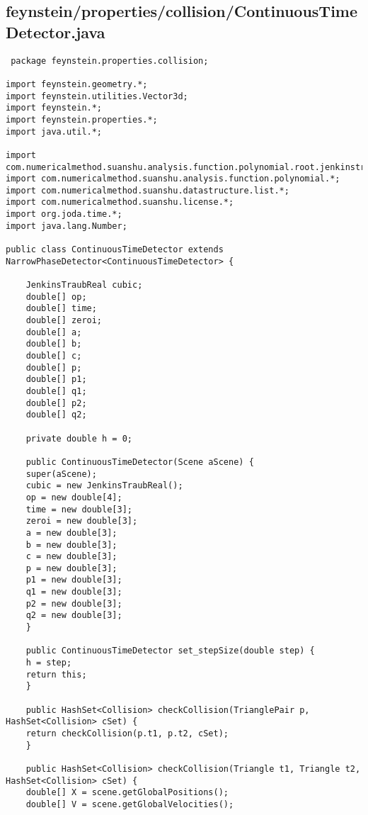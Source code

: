 \subsection*{feynstein/properties/collision/ContinuousTimeDetector.java}
\begin{lstlisting}
 package feynstein.properties.collision;

import feynstein.geometry.*;
import feynstein.utilities.Vector3d;
import feynstein.*;
import feynstein.properties.*;
import java.util.*;

import com.numericalmethod.suanshu.analysis.function.polynomial.root.jenkinstraub.*;
import com.numericalmethod.suanshu.analysis.function.polynomial.*;
import com.numericalmethod.suanshu.datastructure.list.*;
import com.numericalmethod.suanshu.license.*;
import org.joda.time.*;
import java.lang.Number;

public class ContinuousTimeDetector extends NarrowPhaseDetector<ContinuousTimeDetector> {

    JenkinsTraubReal cubic;
    double[] op;
    double[] time;
    double[] zeroi;
    double[] a;
    double[] b;
    double[] c;
    double[] p;
    double[] p1;
    double[] q1;
    double[] p2;
    double[] q2;

    private double h = 0;      

    public ContinuousTimeDetector(Scene aScene) {
	super(aScene);
	cubic = new JenkinsTraubReal();
	op = new double[4];
	time = new double[3];
	zeroi = new double[3];
	a = new double[3];
	b = new double[3];
	c = new double[3];
	p = new double[3];
	p1 = new double[3];
	q1 = new double[3];
	p2 = new double[3];
	q2 = new double[3];
    }

    public ContinuousTimeDetector set_stepSize(double step) {
	h = step;
	return this;
    }
    
    public HashSet<Collision> checkCollision(TrianglePair p, HashSet<Collision> cSet) {
	return checkCollision(p.t1, p.t2, cSet);
    }

    public HashSet<Collision> checkCollision(Triangle t1, Triangle t2, HashSet<Collision> cSet) {
	double[] X = scene.getGlobalPositions();
	double[] V = scene.getGlobalVelocities();


\end{lstlisting}
